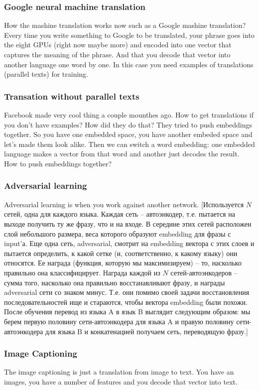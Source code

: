 \subsubsection*{Google neural machine translation}

How the mashine translation works now such as a Google mashine translation? Every time you write something to Google to be translated, your phrase goes into the eight GPUs (right now maybe more) and encoded into one vector that captures the meaning of the phrase. And that you decode that vector into another language one word by one. In this case you need examples of translations (parallel texts) for training.

\subsubsection*{Transation without parallel texts}

Facebook made very cool thing a couple mounthes ago. How to get translations if you don't have examples? How did they do that? They tried to push embeddings together. So you have one embedded space, you have another embeded space and let's made them look alike. Then we can switch a word embedding: one embedded language makes a vector from that word and another just decodes the result. How to push embeddings together?

\vspace{-0.3cm}
\subsubsection*{Adversarial learning}

Adversarial learning is when you work against another network. [Используется $N$ сетей, одна для каждого языка. Каждая сеть -- автоэнкодер, т.е. пытается на выходе получить ту же фразу, что и на входе. В середине этих сетей расположен слой небольшого размера, веса которого образуют embedding для фразы с input'а. Еще одна сеть, adversarial, смотрит на embedding вектора с этих слоев и пытается определить, к какой сетке (и, соответственно, к какому языку) они относятся. Ее награда (функция, которую мы максимизируем) -- то, насколько правильно она классифицирует. Награда каждой из $N$ сетей-автоэнкодеров -- сумма того, насколько она правильно восстанавливают фразу, и награды adversarial сети со знаком минус. Т.е. они помимо своей задачи восстановления последовательностей ище и стараются, чтобы вектора embedding были похожи. После обучения перевод из языка A в язык B выглядит следующим образом: мы берем первую половину сети-автоэнкодера для языка A и правую половину сети-автоэнкодера для языка B и конкатенацией получаем сеть, переводящую фразу.]

\vspace{-0.3cm}
\subsubsection*{Image Captioning}

The image captioning is just a translation from image to text. You have an images, you have a number of features and you decode that vector into text.